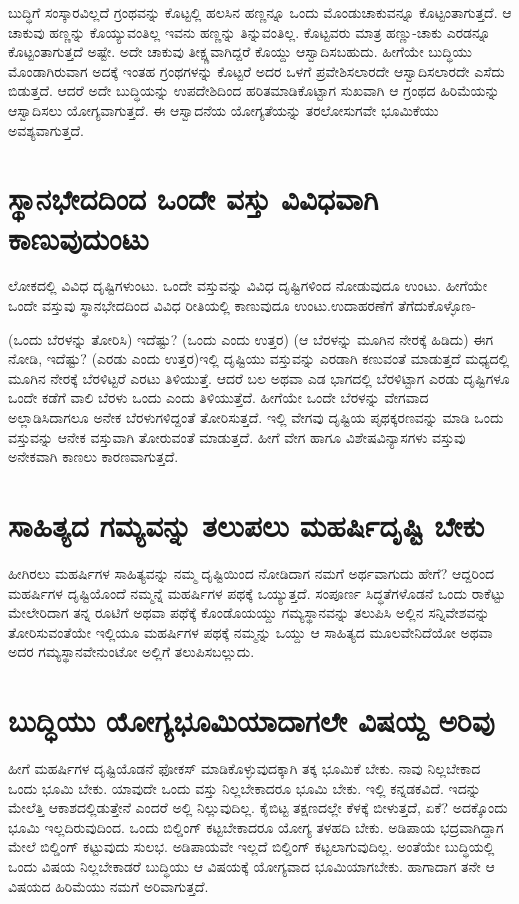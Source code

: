 ಬುದ್ಧಿಗೆ ಸಂಸ್ಕಾರವಿಲ್ಲದೆ ಗ್ರಂಥವನ್ನು ಕೊಟ್ಟಲ್ಲಿ ಹಲಸಿನ ಹಣ್ಣನ್ನೂ ಒಂದು ಮೊಂಡುಚಾಕುವನ್ನೂ ಕೊಟ್ಟಂತಾಗುತ್ತದೆ. ಆ ಚಾಕುವು ಹಣ್ಣನ್ನು ಕೊಯ್ಯುವಂತಿಲ್ಲ ಇವನು ಹಣ್ಣನ್ನು ತಿನ್ನುವಂತಿಲ್ಲ. ಕೊಟ್ಟವರು ಮಾತ್ರ ಹಣ್ಣು-ಚಾಕು ಎರಡನ್ನೂ ಕೊಟ್ಟಂತಾಗುತ್ತದೆ ಅಷ್ಟೇ. ಅದೇ ಚಾಕುವು ತೀಕ್ಷ್ಣವಾಗಿದ್ದರೆ ಕೊಯ್ದು ಆಸ್ವಾದಿಸಬಹುದು. ಹೀಗೆಯೇ ಬುದ್ಧಿಯು ಮೊಂಡಾಗಿರುವಾಗ ಅದಕ್ಕೆ ಇಂತಹ ಗ್ರಂಥಗಳನ್ನು ಕೊಟ್ಟರೆ ಅದರ ಒಳಗೆ ಪ್ರವೇಶಿಸಲಾರದೇ ಆಸ್ವಾದಿಸಲಾರದೇ ಎಸೆದು ಬಿಡುತ್ತದೆ. ಆದರೆ ಅದೇ ಬುದ್ಧಿಯನ್ನು ಉಪದೇಶಿದಿಂದ ಹರಿತಮಾಡಿಕೊಟ್ಟಾಗ ಸುಖವಾಗಿ ಆ ಗ್ರಂಥದ ಹಿರಿಮೆಯನ್ನು ಆಸ್ವಾದಿಸಲು ಯೋಗ್ಯವಾಗುತ್ತದೆ. ಈ ಆಸ್ವಾದನೆಯ ಯೋಗ್ಯತೆಯನ್ನು ತರಲೋಸುಗವೇ ಭೂಮಿಕೆಯು ಅವಶ್ಯವಾಗುತ್ತದೆ.

\section*{ಸ್ಥಾನಭೇದದಿಂದ ಒಂದೇ ವಸ್ತು ವಿವಿಧವಾಗಿ ಕಾಣುವುದುಂಟು}

ಲೋಕದಲ್ಲಿ ವಿವಿಧ ದೃಷ್ಟಿಗಳುಂಟು. ಒಂದೇ ವಸ್ತುವನ್ನು ವಿವಿಧ ದೃಷ್ಟಿಗಳಿಂದ ನೋಡುವುದೂ ಉಂಟು. ಹೀಗೆಯೇ ಒಂದೇ ವಸ್ತುವು ಸ್ಥಾನಭೇದದಿಂದ ವಿವಿಧ ರೀತಿಯಲ್ಲಿ ಕಾಣುವುದೂ ಉಂಟು.ಉದಾಹರಣೆಗೆ ತೆಗೆದುಕೊಳ್ಳೊಣ-

(ಒಂದು ಬೆರಳನ್ನು ತೋರಿಸಿ) ಇದೆಷ್ಟು? (ಒಂದು ಎಂದು ಉತ್ತರ) (ಆ ಬೆರಳನ್ನು ಮೂಗಿನ ನೇರಕ್ಕೆ ಹಿಡಿದು) ಈಗ ನೋಡಿ, ಇದೆಷ್ಟು? (ಎರಡು ಎಂದು ಉತ್ತರ)ಇಲ್ಲಿ ದೃಷ್ಟಿಯು ವಸ್ತುವನ್ನು ಎರಡಾಗಿ ಕಣುವಂತೆ ಮಾಡುತ್ತದೆ ಮಧ್ಯದಲ್ಲಿ ಮೂಗಿನ ನೇರಕ್ಕೆ ಬೆರಳಿಟ್ಟರೆ ಎರಟು ತಿಳಿಯುತ್ತೆ. ಆದರೆ ಬಲ ಅಥವಾ ಎಡ ಭಾಗದಲ್ಲಿ ಬೆರಳಿಟ್ಟಾಗ ಎರಡು ದೃಷ್ಟಿಗಳೂ ಒಂದೇ ಕಡೆಗೆ ವಾಲಿ ಬೆರಳು ಒಂದು ಎಂದು ತಿಳಿಯುತ್ತೆದೆ. ಹೀಗೆಯೇ ಒಂದೇ ಬೆರಳನ್ನು ವೇಗವಾದ ಅಲ್ಲಾಡಿಸಿದಾಗಲೂ ಅನೇಕ ಬೆರಳುಗಳಿದ್ದಂತೆ ತೋರಿಸುತ್ತದೆ. ಇಲ್ಲಿ ವೇಗವು ದೃಷ್ಟಿಯ ಪೃಥಕ್ಕರಣವನ್ನು ಮಾಡಿ ಒಂದು ವಸ್ತುವನ್ನು ಆನೇಕ ವಸ್ತುವಾಗಿ ತೋರುವಂತೆ ಮಾಡುತ್ತದೆ. ಹೀಗೆ ವೇಗ ಹಾಗೂ ವಿಶೇಷವಿನ್ಯಾಸಗಳು ವಸ್ತುವು ಅನೇಕವಾಗಿ ಕಾಣಲು ಕಾರಣವಾಗುತ್ತದೆ. 

\section*{ಸಾಹಿತ್ಯದ ಗಮ್ಯವನ್ನು ತಲುಪಲು ಮಹರ್ಷಿದೃಷ್ಟಿ ಬೇಕು}


ಹೀಗಿರಲು ಮಹರ್ಷಿಗಳ ಸಾಹಿತ್ಯವನ್ನು ನಮ್ಮ ದೃಷ್ಟಿಯಿಂದ ನೋಡಿದಾಗ ನಮಗೆ ಅರ್ಥವಾಗುದು ಹೇಗೆ? ಆದ್ದರಿಂದ ಮಹರ್ಷಿಗಳ ದೃಷ್ಟಿಯೊಂದೆ ನಮ್ಮನ್ನೆ ಮಹರ್ಷಿಗಳ ಪಥಕ್ಕೆ ಒಯ್ಯುತ್ತದೆ. ಸಂಪೂರ್ಣ ಸಿದ್ಧತೆಗಳೊಡನೆ ಒಂದು ರಾಕೆಟ್ಟು ಮೇಲೇರಿದಾಗ ತನ್ನ ರೂಟಿಗೆ ಅಥವಾ ಪಥೆಕ್ಕೆ ಕೊಂಡೊಯಯ್ದು ಗಮ್ಯಸ್ಥಾನವನ್ನು ತಲುಪಿಸಿ ಅಲ್ಲಿನ ಸನ್ನಿವೇಶವನ್ನು ತೋರಿಸುವಂತೆಯೇ ಇಲ್ಲಿಯೂ ಮಹರ್ಷಿಗಳ ಪಥಕ್ಕೆ ನಮ್ಮನ್ನು ಒಯ್ದು ಆ ಸಾಹಿತ್ಯದ ಮೂಲವೇನಿದೆಯೋ ಅಥವಾ ಅದರ ಗಮ್ಯಸ್ಥಾನವೇನುಂಟೋ ಅಲ್ಲಿಗೆ ತಲುಪಿಸಬಲ್ಲುದು. 

\section*{ಬುದ್ಧಿಯು ಯೋಗ್ಯಭೂಮಿಯಾದಾಗಲೇ ವಿಷಯ್ದ ಅರಿವು}

ಹೀಗೆ ಮಹರ್ಷಿಗಳ ದೃಷ್ಟಿಯೊಡನೆ ಫೋಕಸ್ ಮಾಡಿಕೊಳ್ಳುವುದಕ್ಕಾಗಿ ತಕ್ಕ ಭೂಮಿಕೆ ಬೇಕು. ನಾವು ನಿಲ್ಲಬೇಕಾದ ಒಂದು ಭೂಮಿ ಬೇಕು. ಯಾವುದೇ ಒಂದು ವಸ್ತು ನಿಲ್ಲಬೇಕಾದರೂ ಭೂಮಿ ಬೇಕು. ಇಲ್ಲಿ ಕನ್ನಡಕವಿದೆ. ಇದನ್ನು ಮೇಲೆತ್ತಿ ಆಕಾಶದಲ್ಲಿಡುತ್ತೇನೆ ಎಂದರೆ ಅಲ್ಲಿ ನಿಲ್ಲುವುದಿಲ್ಲ. ಕೈಬಿಟ್ಟ ತಕ್ಷಣದಲ್ಲೇ ಕೆಳಕ್ಕೆ ಬೀಳುತ್ತದೆ, ಏಕೆ? ಅದಕ್ಕೊಂದು ಭೂಮಿ ಇಲ್ಲದಿರುವುದಿಂದ. ಒಂದು ಬಿಲ್ಡಿಂಗ್ ಕಟ್ಟಬೇಕಾದರೂ ಯೋಗ್ಯ ತಳಹದಿ ಬೇಕು. ಅಡಿಪಾಯ ಭದ್ರವಾಗಿದ್ದಾಗ ಮೇಲೆ ಬಿಲ್ಡಿಂಗ್ ಕಟ್ಟುವುದು ಸುಲಭ. ಅಡಿಪಾಯವೇ ಇಲ್ಲದೆ ಬಿಲ್ಡಿಂಗ್ ಕಟ್ಟಲಾಗುವುದಿಲ್ಲ. ಅಂತೆಯೇ ಬುದ್ಧಿಯಲ್ಲಿ ಒಂದು ವಿಷಯ ನಿಲ್ಲಬೇಕಾಡರೆ ಬುದ್ಧಿಯು ಆ ವಿಷಯಕ್ಕೆ ಯೋಗ್ಯವಾದ ಭೂಮಿಯಾಗಬೇಕು. ಹಾಗಾದಾಗ ತನೇ ಆ ವಿಷಯದ ಹಿರಿಮೆಯು ನಮಗೆ ಅರಿವಾಗುತ್ತದೆ. 

